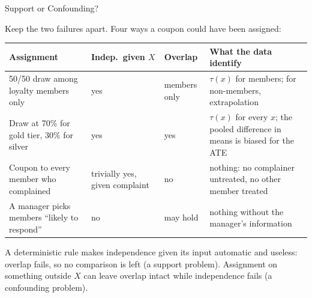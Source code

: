\documentclass[aspectratio=169, 11pt, handout]{beamer}
\begin{document}
\begin{frame}{Support or Confounding?}

Keep the two failures apart. Four ways a coupon could have been assigned:

\begin{center}
\small
\begin{tabular}{p{4.2cm}p{2.3cm}p{1.8cm}p{4.3cm}}
\toprule
\textbf{Assignment} & \textbf{Indep.\ given $X$} & \textbf{Overlap} & \textbf{What the data identify} \\
\midrule
50/50 draw among loyalty members only & \textcolor{sbgreen}{yes} & \textcolor{warnred}{members only} & $\tau(x)$ for members; for non-members, extrapolation \\[0.4em]
Draw at 70\% for gold tier, 30\% for silver & \textcolor{sbgreen}{yes} & \textcolor{sbgreen}{yes} & $\tau(x)$ for every $x$; the pooled difference in means is biased for the ATE \\[0.4em]
Coupon to every member who complained & trivially yes, given complaint & \textcolor{warnred}{no} & nothing: no complainer untreated, no other member treated \\[0.4em]
A manager picks members ``likely to respond'' & \textcolor{warnred}{no} & may hold & nothing without the manager's information \\
\bottomrule
\end{tabular}
\end{center}

\medskip

A deterministic rule makes independence given its input automatic and useless: overlap fails, so no comparison is left (a support problem). Assignment on something outside $X$ can leave overlap intact while independence fails (a confounding problem).
\end{frame}
\end{document}
